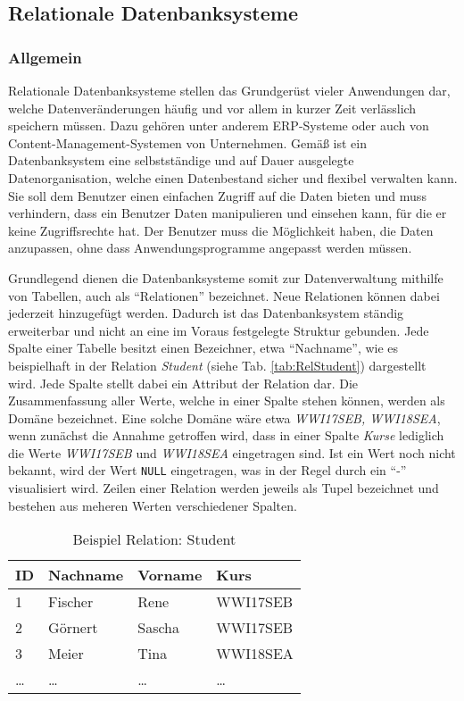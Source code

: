\subsection{Relationale Datenbanksysteme}

\subsubsection{Allgemein}

Relationale Datenbanksysteme stellen das Grundgerüst vieler Anwendungen dar, welche Datenveränderungen häufig und vor allem in kurzer Zeit verlässlich speichern müssen.
Dazu gehören unter anderem \ac{ERP}-Systeme oder auch von Content-Management-Systemen von Unternehmen.
Gemäß \citeauthor{Book_DB_2} ist ein Datenbanksystem eine selbstständige und auf Dauer ausgelegte Datenorganisation, welche einen Datenbestand sicher und flexibel verwalten kann.
Sie soll dem Benutzer einen einfachen Zugriff auf die Daten bieten und muss verhindern, dass ein Benutzer Daten manipulieren und einsehen kann, für die er keine Zugriffsrechte hat.
Der Benutzer muss die Möglichkeit haben, die Daten anzupassen, ohne dass Anwendungsprogramme angepasst werden müssen.\autocite[Vgl.][S.5 f.]{Book_DB_2}

Grundlegend dienen die Datenbanksysteme somit zur Datenverwaltung mithilfe von Tabellen, auch als \enquote{Relationen} bezeichnet.
Neue Relationen können dabei jederzeit hinzugefügt werden. 
Dadurch ist das Datenbanksystem ständig erweiterbar und nicht an eine im Voraus festgelegte Struktur gebunden.
Jede Spalte einer Tabelle besitzt einen Bezeichner, etwa \enquote{Nachname}, wie es beispielhaft in der Relation \emph{Student} (siehe Tab. \vref{tab:RelStudent}) dargestellt wird.
Jede Spalte stellt dabei ein Attribut der Relation dar.
Die Zusammenfassung aller Werte, welche in einer Spalte stehen können, werden als Domäne bezeichnet.
Eine solche Domäne wäre etwa \emph{WWI17SEB, WWI18SEA}, wenn zunächst die Annahme getroffen wird, dass in einer Spalte \emph{Kurse} lediglich die Werte \emph{WWI17SEB} und \emph{WWI18SEA} eingetragen sind.
Ist ein Wert noch nicht bekannt, wird der Wert \texttt{NULL} eingetragen, was in der Regel durch ein \enquote{-} visualisiert wird.
Zeilen einer Relation werden jeweils als Tupel bezeichnet und bestehen aus meheren Werten verschiedener Spalten.\autocite[Vgl.][S.9 ff.]{Book_DB_2}

\begin{table}
    \centering
    \begin{tabular}[h]{l | l | l | l}
        ID & Nachname & Vorname & Kurs \\ \hline
        1 & Fischer & Rene & WWI17SEB \\
        2 & Görnert & Sascha & WWI17SEB \\
        3 & Meier & Tina & WWI18SEA \\
        \dots & \dots & \dots & \dots \\
        \end{tabular}
        \caption{Beispiel Relation: Student}
        \label{tab:RelStudent}
\end{table}


